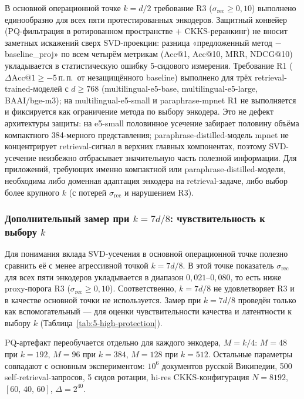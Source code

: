 \documentclass[a4paper, 12pt, oneside, openany]{article}
\begin{document}
 В основной операционной точке $k = d/2$ требование R3 ($\sigma_{\mathrm{rec}} \geq 0{,}10$) выполнено единообразно для всех пяти протестированных энкодеров. Защитный конвейер (PQ-фильтрация в ротированном пространстве + CKKS-реранкинг) не вносит заметных искажений сверх SVD-проекции: разница «предложенный метод $-$ baseline\_proj» по всем четырём метрикам (Acc@1, Acc@10, MRR, NDCG@10) укладывается в статистическую ошибку 5-сидового измерения. Требование R1 ($\Delta\mathrm{Acc@1} \geq -5$\,п.\,п.\ от незащищённого baseline) выполнено для трёх retrieval-trained-моделей с $d \geq 768$ (multilingual-e5-base, multilingual-e5-large, BAAI/bge-m3); на multilingual-e5-small и paraphrase-mpnet R1 не выполняется и фиксируется как ограничение метода по выбору энкодера. Это не дефект архитектуры защиты: на e5-small половинное усечение забирает половину объёма компактного 384-мерного представления; paraphrase-distilled-модель mpnet не концентрирует retrieval-сигнал в верхних главных компонентах, поэтому SVD-усечение неизбежно отбрасывает значительную часть полезной информации. Для приложений, требующих именно компактной или paraphrase-distilled-модели, необходима либо доменная адаптация энкодера на retrieval-задаче, либо выбор более крупного $k$ (с потерей $\sigma_{\mathrm{rec}}$ и нарушением R3).

\subsubsection{Дополнительный замер при $k = 7d/8$: чувствительность к выбору $k$}\label{subsubsec:high-protection}

Для понимания вклада SVD-усечения в основной операционной точке полезно сравнить её с менее агрессивной точкой $k = 7d/8$. В этой точке показатель $\sigma_{\mathrm{rec}}$ для всех пяти энкодеров укладывается в диапазон $0{,}021$--$0{,}080$, то есть ниже proxy-порога R3 ($\sigma_{\mathrm{rec}} \geq 0{,}10$). Соответственно, $k = 7d/8$ не удовлетворяет R3 и в качестве основной точки не используется. Замер при $k = 7d/8$ проведён только как вспомогательный --- для оценки чувствительности качества и латентности к выбору $k$ (Таблица~\ref{tab:5-high-protection}).

PQ-артефакт переобучается отдельно для каждого энкодера, $M = k/4$: $M = 48$ при $k = 192$, $M = 96$ при $k = 384$, $M = 128$ при $k = 512$. Остальные параметры совпадают с основным экспериментом: $10^6$ документов русской Википедии, 500 self-retrieval-запросов, 5 сидов ротации, hi-res CKKS-конфигурация $N = 8192$, $[60,\,40,\,60]$, $\Delta = 2^{40}$.
\end{document}
